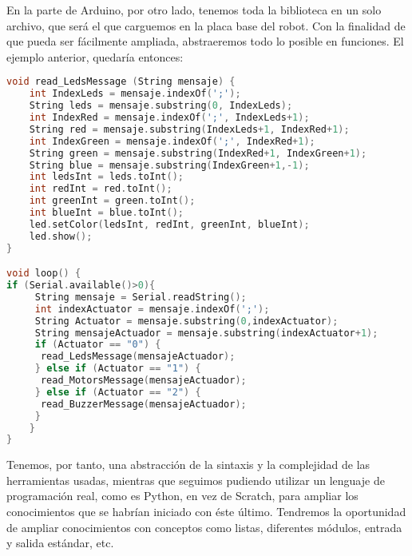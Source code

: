 En la parte de Arduino, por otro lado, tenemos toda la biblioteca en un solo archivo, que será el que carguemos en la placa base del robot. Con la finalidad de que pueda ser fácilmente ampliada, abstraeremos todo lo posible en funciones. El ejemplo anterior, quedaría entonces:
\begin{lstlisting}[language=C]	
void read_LedsMessage (String mensaje) {
	int IndexLeds = mensaje.indexOf(';');
	String leds = mensaje.substring(0, IndexLeds);
	int IndexRed = mensaje.indexOf(';', IndexLeds+1);
	String red = mensaje.substring(IndexLeds+1, IndexRed+1);
	int IndexGreen = mensaje.indexOf(';', IndexRed+1);
	String green = mensaje.substring(IndexRed+1, IndexGreen+1);
	String blue = mensaje.substring(IndexGreen+1,-1);
	int ledsInt = leds.toInt();
	int redInt = red.toInt();
	int greenInt = green.toInt();
	int blueInt = blue.toInt();
	led.setColor(ledsInt, redInt, greenInt, blueInt);
	led.show();
}

void loop() {
if (Serial.available()>0){
	 String mensaje = Serial.readString();
	 int indexActuator = mensaje.indexOf(';');
	 String Actuator = mensaje.substring(0,indexActuator);
	 String mensajeActuador = mensaje.substring(indexActuator+1);
	 if (Actuator == "0") {
	  read_LedsMessage(mensajeActuador);
	 } else if (Actuator == "1") {
	  read_MotorsMessage(mensajeActuador);
	 } else if (Actuator == "2") {
	  read_BuzzerMessage(mensajeActuador);
	 }
	}
}
\end{lstlisting}


Tenemos, por tanto, una abstracción de la sintaxis y la complejidad de las herramientas usadas, mientras que seguimos pudiendo utilizar un lenguaje de programación real, como es Python, en vez de Scratch, para ampliar los conocimientos que se habrían iniciado con éste último. Tendremos la oportunidad de ampliar conocimientos con conceptos como listas, diferentes módulos, entrada y salida estándar, etc. 